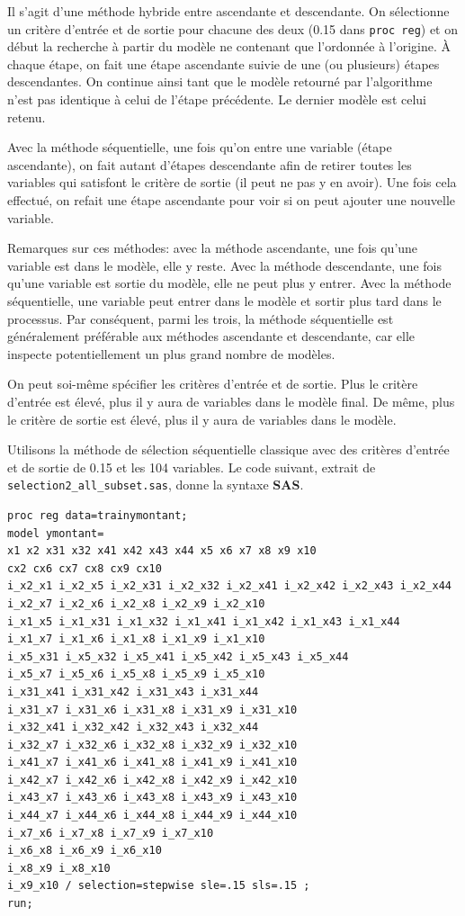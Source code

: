 \documentclass[
  11pt,
  letterpaper,
]{book}
\theoremstyle{definition}
\theoremstyle{definition}
\theoremstyle{definition}
\theoremstyle{remark}
\begin{document}
Il s'agit d'une méthode hybride entre ascendante et descendante. On sélectionne un critère d'entrée et de sortie pour chacune des deux (0.15 dans \texttt{proc\ reg}) et on début la recherche à partir du modèle ne contenant que l'ordonnée à l'origine. À chaque étape, on fait une étape ascendante suivie de une (ou plusieurs) étapes descendantes. On continue ainsi tant que le modèle retourné par l'algorithme n'est pas identique à celui de l'étape précédente. Le dernier modèle est celui retenu.

Avec la méthode séquentielle, une fois qu'on entre une variable (étape ascendante), on fait autant d'étapes descendante afin de retirer toutes les variables qui satisfont le critère de sortie (il peut ne pas y en avoir). Une fois cela effectué, on refait une étape ascendante pour voir si on peut ajouter une nouvelle variable.

Remarques sur ces méthodes: avec la méthode ascendante, une fois qu'une variable est dans le modèle, elle y reste. Avec la méthode descendante, une fois qu'une variable est sortie du modèle, elle ne peut plus y entrer. Avec la méthode séquentielle, une variable peut entrer dans le modèle et sortir plus tard dans le processus. Par conséquent, parmi les trois, la méthode séquentielle est généralement préférable aux méthodes ascendante et descendante, car elle inspecte potentiellement un plus grand nombre de modèles.

On peut soi-même spécifier les critères d'entrée et de sortie. Plus le critère d'entrée est élevé, plus il y aura de variables dans le modèle final. De même, plus le critère de sortie est élevé, plus il y aura de variables dans le modèle.

Utilisons la méthode de sélection séquentielle classique avec des critères d'entrée et de sortie de 0.15 et les 104 variables. Le code suivant, extrait de \texttt{selection2\_all\_subset.sas}, donne la syntaxe \textbf{SAS}.

\begin{verbatim}
proc reg data=trainymontant;
model ymontant=
x1 x2 x31 x32 x41 x42 x43 x44 x5 x6 x7 x8 x9 x10
cx2 cx6 cx7 cx8 cx9 cx10
i_x2_x1 i_x2_x5 i_x2_x31 i_x2_x32 i_x2_x41 i_x2_x42 i_x2_x43 i_x2_x44
i_x2_x7 i_x2_x6 i_x2_x8 i_x2_x9 i_x2_x10
i_x1_x5 i_x1_x31 i_x1_x32 i_x1_x41 i_x1_x42 i_x1_x43 i_x1_x44
i_x1_x7 i_x1_x6 i_x1_x8 i_x1_x9 i_x1_x10
i_x5_x31 i_x5_x32 i_x5_x41 i_x5_x42 i_x5_x43 i_x5_x44
i_x5_x7 i_x5_x6 i_x5_x8 i_x5_x9 i_x5_x10
i_x31_x41 i_x31_x42 i_x31_x43 i_x31_x44
i_x31_x7 i_x31_x6 i_x31_x8 i_x31_x9 i_x31_x10
i_x32_x41 i_x32_x42 i_x32_x43 i_x32_x44
i_x32_x7 i_x32_x6 i_x32_x8 i_x32_x9 i_x32_x10
i_x41_x7 i_x41_x6 i_x41_x8 i_x41_x9 i_x41_x10
i_x42_x7 i_x42_x6 i_x42_x8 i_x42_x9 i_x42_x10
i_x43_x7 i_x43_x6 i_x43_x8 i_x43_x9 i_x43_x10
i_x44_x7 i_x44_x6 i_x44_x8 i_x44_x9 i_x44_x10
i_x7_x6 i_x7_x8 i_x7_x9 i_x7_x10
i_x6_x8 i_x6_x9 i_x6_x10
i_x8_x9 i_x8_x10
i_x9_x10 / selection=stepwise sle=.15 sls=.15 ;
run;
\end{verbatim}
\end{document}
